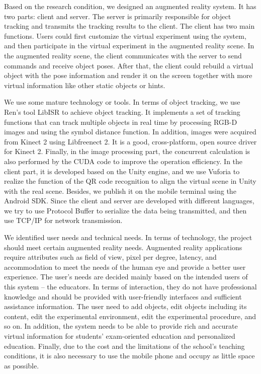 \begin{bigabstract}
Based on the research condition, we designed an augmented reality system. It has two parts: client and server. The server is primarily responsible for object tracking and transmits the tracking results to the client. The client has two main functions. Users could first customize the virtual experiment using the system, and then participate in the virtual experiment in the augmented reality scene. In the augmented reality scene, the client communicates with the server to send commands and receive object poses. After that, the client could rebuild a virtual object with the pose information and render it on the screen together with more virtual information like other static objects or hints.

We use some mature technology or tools. In terms of object tracking, we use Ren's tool LibISR\cite{Ren_3DV_2014, star3d_iccv_2013} to achieve object tracking. It implements a set of tracking functions that can track multiple objects in real time by processing RGB-D images and using the symbol distance function. In addition, images were acquired from Kinect 2 using Libfreenect 2\cite{libfreenect2}. It is a good, cross-platform, open source driver for Kinect 2. Finally, in the image processing part, the concurrent calculation is also performed by the CUDA\cite{CUDARef} code to improve the operation efficiency. In the client part, it is developed based on the Unity engine\cite{Unity}, and we use Vuforia\cite{Vuforia} to realize the function of the QR code recognition to align the virtual scene in Unity with the real scene. Besides, we publish it on the mobile terminal using the Android SDK. Since the client and server are developed with different languages, we try to use Protocol Buffer to serialize the data being transmitted, and then use TCP/IP for network transmission.

We identified user needs and technical needs. In terms of technology, the project should meet certain augmented reality needs. Augmented reality applications require attributes such as field of view, pixel per degree, latency, and accommodation to meet the needs of the human eye and provide a better user experience. The user's needs are decided mainly based on the intended users of this system – the educators. In terms of interaction, they do not have professional knowledge and should be provided with user-friendly interfaces and sufficient assistance information. The user need to add objects, edit objects including its content, edit the experimental environment, edit the experimental procedure, and so on. In addition, the system needs to be able to provide rich and accurate virtual information for students' exam-oriented education and personalized education. Finally, due to the cost and the limitations of the school's teaching conditions, it is also necessary to use the mobile phone and occupy as little space as possible.


\end{bigabstract}
